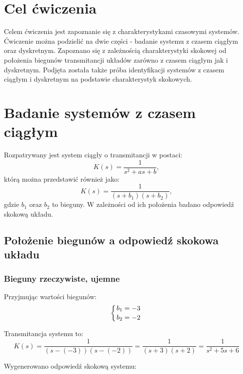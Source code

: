 \documentclass[12pt]{article}
\begin{document}

\tableofcontents
\newpage

\section{Cel ćwiczenia}
Celem ćwiczenia jest zapoznanie się z charakterystykami czasowymi systemów. Ćwiczenie można podzielić na dwie części - badanie systemu z czasem ciągłym oraz dyskretnym. Zapoznano się z zależnością charakterystyki skokowej od położenia biegunów transmitancji układów zarówno z czasem ciągłym jak i dyskretnym. Podjęta została także próba identyfikacji systemów z czasem ciągłym i dyskretnym na podstawie charakterystyk skokowych.


\section{Badanie systemów z czasem ciągłym}

Rozpatrywany jest system ciągły o transmitancji w postaci:
\begin{equation}
    K(s) = \frac{1}{s^2+as+b},
\end{equation}
którą można przedstawić również jako:
\begin{equation}
    K(s) = \frac{1}{(s+b_1)(s+b_2)},
\end{equation}
gdzie $b_1$ oraz $b_2$ to bieguny. W zależności od ich położenia badano odpowiedź skokową układu.

\subsection{Położenie biegunów a odpowiedź skokowa układu}

\subsubsection{Bieguny rzeczywiste, ujemne}
Przyjmując wartości biegunów:
\begin{equation*}
    \left\{{{b_1 = -3}\atop {b_2 = -2}}\right.
\end{equation*}

Transmitancja systemu to:
\begin{equation}
    K(s) = \frac{1}{(s-(-3))(s-(-2))} = \frac{1}{(s+3)(s+2)} = \frac{1}{s^2+5s+6}
\end{equation}

Wygenerowano odpowiedź skokową systemu:
\end{document}
